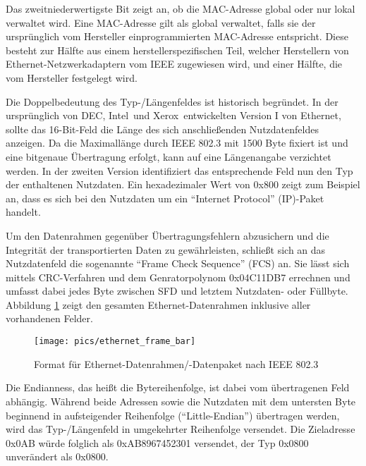 Das zweitniederwertigste Bit zeigt an, ob die
MAC-Adresse global oder nur lokal verwaltet wird. Eine MAC-Adresse
gilt als global verwaltet, falls sie der ursprünglich vom Hersteller 
einprogrammierten MAC-Adresse entspricht. Diese besteht zur Hälfte aus
einem herstellerspezifischen Teil, welcher Herstellern von
E\-ther\-net-Netz\-werk\-a\-dap\-tern vom IEEE zugewiesen wird, und einer
Hälfte, die vom Hersteller festgelegt wird.

Die Doppelbedeutung des Typ-/Längenfeldes ist historisch begründet. In
der ursprünglich von DEC\TReg, Intel\TReg\ und Xerox\TReg\
entwickelten Version I von Ethernet, sollte das 16-Bit-Feld die Länge
des sich anschließenden Nutzdatenfeldes anzeigen. Da die Maximallänge
durch IEEE 802.3 mit 1500 Byte fixiert ist und eine bitgenaue
Übertragung erfolgt, kann auf eine Längenangabe verzichtet werden. In
der zweiten Version identifiziert das entsprechende Feld nun den Typ
der enthaltenen Nutzdaten. Ein hexadezimaler Wert von 0x800 zeigt zum
Beispiel an, dass es sich bei den Nutzdaten um ein ``Internet
Protocol'' (IP)-Paket handelt.

Um den Datenrahmen gegenüber Übertragungsfehlern abzusichern und die
Integrität der transportierten Daten zu gewährleisten, schließt sich
an das Nutzdatenfeld die sogenannte ``Frame Check Sequence'' (FCS)
an. Sie lässt sich mittels CRC-Verfahren und dem Genratorpolynom
0x04C11DB7 errechnen und umfasst dabei jedes Byte zwischen SFD und
letztem Nutzdaten- oder Füllbyte. Abbildung
\ref{fig:grundlagen_ethernet_ethernet_frame} zeigt den gesamten
Ethernet-Datenrahmen inklusive aller vorhandenen Felder.

\begin{figure}[htbp]
	\centering
	\texttt{[image: pics/ethernet\_frame\_bar]}
	\caption{Format für Ethernet-Datenrahmen/-Datenpaket nach IEEE 802.3}
	\label{fig:grundlagen_ethernet_ethernet_frame}
\end{figure}

Die Endianness, das heißt die Bytereihenfolge, ist dabei vom
übertragenen Feld abhängig. Während beide Adressen sowie die Nutzdaten
mit dem untersten Byte beginnend in aufsteigender Reihenfolge
(``Little-Endian'') übertragen werden, wird das Typ-/Längenfeld in
umgekehrter Reihenfolge versendet. Die Zieladresse 0x0\-1\-2\-3\-4\-A\-B würde
folglich als 0xAB8967452301 versendet, der Typ 0x0800 unverändert als
0x0800. 

